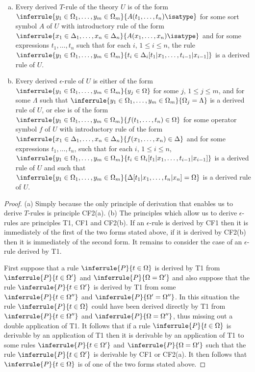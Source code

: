 \begin{lemma}

  \begin{enumerate}[(a)]
    \item Every derived $T$-rule of the theory $U$ is of the form $\inferrule{y_1\in\Omega_1,\ldots,y_m\in\Omega_m}{A(t_1,\ldots,t_n)\isatype}$ for some sort symbol $A$ of $U$ with introductory rule of the form $\inferrule{x_1\in\Delta_1,\ldots,x_n\in\Delta_n}{A(x_1,\ldots,x_n)\isatype}$ and for some expressions $t_1,\ldots,t_n$ such that for each $i$, $1\leq i\leq n$, the rule $\inferrule{y_1\in\Omega_1,\ldots,y_m\in\Omega_m}{t_i\in\Delta_i[t_1|x_1,\ldots,t_{i-1}|x_{i-1}]}$ is a derived rule of $U$.
    \item Every derived $\epsilon$-rule of $U$ is either of the form $\inferrule{y_1\in\Omega_1,\ldots,y_m\in\Omega_m}{y_j\in\Omega}$ for some $j$, $1\leq j\leq m$, and for some $\Lambda$ such that $\inferrule{y_1\in\Omega_1,\ldots,y_m\in\Omega_m}{\Omega_j=\Lambda}$ is a derived rule of $U$, or else is of the form $\inferrule{y_1\in\Omega_1,\ldots,y_m\in\Omega_m}{f(t_1,\ldots,t_n)\in\Omega}$ for some operator symbol $f$ of $U$ with introductory rule of the form $\inferrule{x_1\in\Delta_1,\ldots,x_n\in\Delta_n}{f(x_1,\ldots,x_n)\in\Delta}$ and for some expressions $t_1,\ldots,t_n$, such that for each $i$, $1\leq i\leq n$, $\inferrule{y_1\in\Omega_1,\ldots,y_m\in\Omega_m}{t_i\in\Omega_i[t_1|x_1,\ldots,t_{i-1}|x_{i-1}]}$ is a derived rule of $U$ and such that $\inferrule{y_1\in\Omega_1,\ldots,y_m\in\Omega_m}{\Delta[t_1|x_1,\ldots,t_n|x_n]=\Omega}$ is a derived rule of $U$.
  \end{enumerate}
\end{lemma}
\begin{proof}
  (a) Simply because the only principle of derivation that enables us to derive $T$-rules is principle CF2(a).
  (b) The principles which allow us to derive $\epsilon$-rules are principles T1, CF1 and CF2(b).
  If an $\epsilon$-rule is derived by CF1 then it is immediately of the first of the two forms stated above, if it is derived by CF2(b) then it is immediately of the second form.
  It remains to consider the case of an $\epsilon$-rule derived by T1.

  First suppose that a rule $\inferrule{P}{t\in\Omega}$ is derived by T1 from $\inferrule{P}{t\in\Omega'}$ and $\inferrule{P}{\Omega=\Omega'}$ and also suppose that the rule $\inferrule{P}{t\in\Omega'}$ is derived by T1 from some $\inferrule{P}{t\in\Omega''}$ and $\inferrule{P}{\Omega'=\Omega''}$.
  In this situation the rule $\inferrule{P}{t\in\Omega}$ could have been derived directly by T1 from $\inferrule{P}{t\in\Omega''}$ and $\inferrule{P}{\Omega=\Omega''}$, thus missing out a double application of T1.
  It follows that if a rule $\inferrule{P}{t\in\Omega}$ is derivable by an application of T1 then it is derivable by an application of T1 to some rules $\inferrule{P}{t\in\Omega'}$ and $\inferrule{P}{\Omega=\Omega'}$ such that the rule $\inferrule{P}{t\in\Omega'}$ is derivable by CF1 or CF2(a).
  It then follows that $\inferrule{P}{t\in\Omega}$ is of one of the two forms stated above.
\end{proof}

